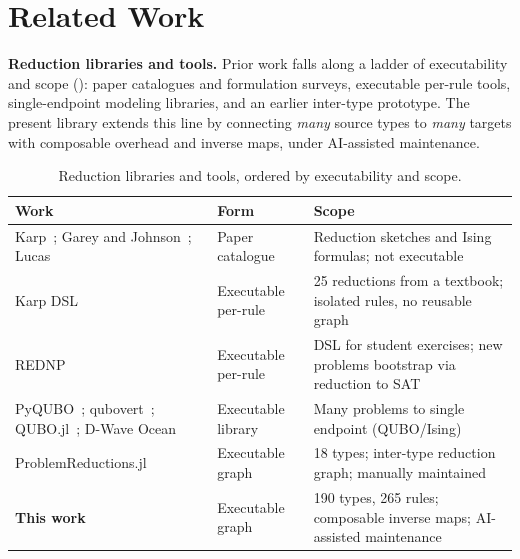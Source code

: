 \documentclass{article}
\begin{document}






\appendix

\section{Related Work}\label{sec:related}

\textbf{Reduction libraries and tools.}
Prior work falls along a ladder of executability and scope (): paper catalogues and formulation surveys, executable per-rule tools, single-endpoint modeling libraries, and an earlier inter-type prototype. The present library extends this line by connecting \emph{many} source types to \emph{many} targets with composable overhead and inverse maps, under AI-assisted maintenance.

\begin{table}[h]
\caption{Reduction libraries and tools, ordered by executability and scope.}
\label{tab:related-reductions}
\centering
\small
\setlength{\tabcolsep}{4pt}
\begin{tabular}{@{}p{4.5cm}p{2.6cm}p{6cm}@{}}
\toprule
Work & Form & Scope \\
\midrule
Karp~\cite{karp1972}; Garey and Johnson~\cite{garey1979}; Lucas~\cite{lucas2014} & Paper catalogue & Reduction sketches and Ising formulas; not executable \\
Karp DSL~\cite{Zhang2022Karp} & Executable per-rule & 25 reductions from a textbook; isolated rules, no reusable graph \\
REDNP~\cite{Creus2014REDNP} & Executable per-rule & DSL for student exercises; new problems bootstrap via reduction to SAT \\
PyQUBO~\cite{Zaman2021PyQUBO}; qubovert~\cite{Iosue2022qubovert}; QUBO.jl~\cite{Monteiro2022ToQUBO}; D-Wave Ocean~\cite{DWaveOcean2026} & Executable library & Many problems to single endpoint (QUBO/Ising) \\
ProblemReductions.jl~\cite{gao2025programming,Liu2023GenericTN} & Executable graph & 18 types; inter-type reduction graph; manually maintained \\
\textbf{This work} & Executable graph & 190 types, 265 rules; composable inverse maps; AI-assisted maintenance \\
\bottomrule
\end{tabular}
\end{table}
\end{document}
